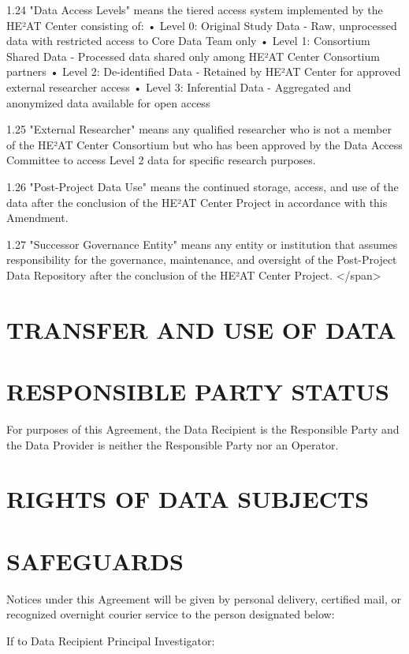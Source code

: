 \documentclass[12pt,letterpaper]{article}
\begin{document}
1.24 "Data Access Levels" means the tiered access system implemented by the HE²AT Center consisting of: • Level 0: Original Study Data - Raw, unprocessed data with restricted access to Core Data Team only • Level 1: Consortium Shared Data - Processed data shared only among HE²AT Center Consortium partners • Level 2: De-identified Data - Retained by HE²AT Center for approved external researcher access • Level 3: Inferential Data - Aggregated and anonymized data available for open access

1.25 "External Researcher" means any qualified researcher who is not a member of the HE²AT Center Consortium but who has been approved by the Data Access Committee to access Level 2 data for specific research purposes.

1.26 "Post-Project Data Use" means the continued storage, access, and use of the data after the conclusion of the HE²AT Center Project in accordance with this Amendment.

1.27 "Successor Governance Entity" means any entity or institution that assumes responsibility for the governance, maintenance, and oversight of the Post-Project Data Repository after the conclusion of the HE²AT Center Project. </span>

\section*{TRANSFER AND USE OF DATA}

\section*{RESPONSIBLE PARTY STATUS}

For purposes of this Agreement, the Data Recipient is the Responsible Party and the Data Provider is neither the Responsible Party nor an Operator.

\section*{RIGHTS OF DATA SUBJECTS}

\section*{SAFEGUARDS}

Notices under this Agreement will be given by personal delivery, certified mail, or recognized overnight courier service to the person designated below:

If to Data Recipient Principal Investigator:
\end{document}

